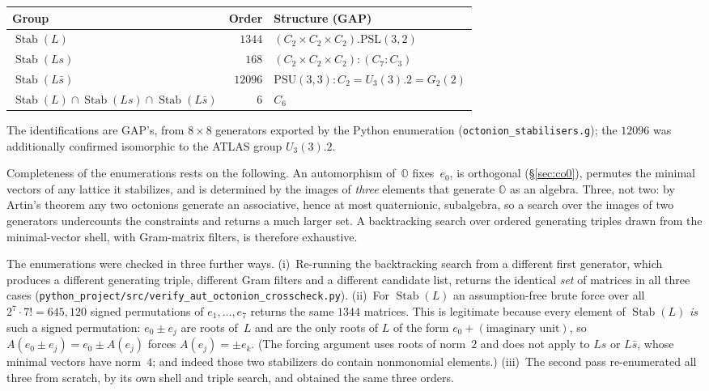 \documentclass[11pt]{amsart}
\newcommand{\OO}{\mathbb{O}}
\DeclareMathOperator{\Stab}{Stab}
\theoremstyle{definition}
\theoremstyle{remark}
\begin{document}
\begin{center}
\begin{tabular}{lrl}
\toprule
Group & Order & Structure (GAP) \\
\midrule
$\Stab(L)$        & $1344$  & $(C_2 \times C_2 \times C_2).\mathrm{PSL}(3,2)$ \\
$\Stab(Ls)$       & $168$   & $(C_2 \times C_2 \times C_2){:}(C_7{:}C_3)$ \\
$\Stab(L\bar s)$  & $12096$ & $\mathrm{PSU}(3,3){:}C_2 = U_3(3).2 = G_2(2)$ \\
\midrule
$\Stab(L) \cap \Stab(Ls) \cap \Stab(L\bar s)$ & $6$ & $C_6$ \\
\bottomrule
\end{tabular}
\end{center}

The identifications are GAP's, from
$8 \times 8$ generators exported by the Python enumeration
(\texttt{octonion\_stabilisers.g}); the $12096$ was additionally
confirmed isomorphic to the ATLAS group $U_3(3).2$.

Completeness of the enumerations rests on the following. An automorphism
of~$\OO$ fixes~$e_0$, is orthogonal (\S\ref{sec:co0}), permutes the minimal
vectors of any lattice it stabilizes, and is determined by the images of
\emph{three} elements that generate $\OO$ as an algebra. Three, not two: by
Artin's theorem any two octonions generate an associative, hence at most
quaternionic, subalgebra, so a search over the images of two generators
undercounts the constraints and returns a much larger set. A backtracking
search over ordered generating triples drawn from the minimal-vector shell,
with Gram-matrix filters, is therefore exhaustive.

The enumerations were checked in three further ways.
(i)~Re-running the backtracking search from a different first generator, which
produces a different generating triple, different Gram filters and a different
candidate list, returns the identical \emph{set} of matrices in all three
cases (\texttt{python\_project/src/verify\_aut\_octonion\_crosscheck.py}).
(ii)~For $\Stab(L)$ an assumption-free brute force over all
$2^7 \cdot 7! = 645{,}120$ signed permutations of $e_1, \ldots, e_7$ returns
the same $1344$ matrices. This is legitimate because every element of
$\Stab(L)$ \emph{is} such a signed permutation: $e_0 \pm e_j$ are roots of~$L$
and are the only roots of $L$ of the form $e_0 + (\text{imaginary unit})$, so
$A(e_0 \pm e_j) = e_0 \pm A(e_j)$ forces $A(e_j) = \pm e_k$. (The forcing
argument uses roots of norm~$2$ and does not apply to $Ls$ or $L\bar s$, whose
minimal vectors have norm~$4$; and indeed those two stabilizers do contain
nonmonomial elements.)
(iii)~The second pass re-enumerated all three from scratch, by its own shell
and triple search, and obtained the same three orders.
\end{document}
